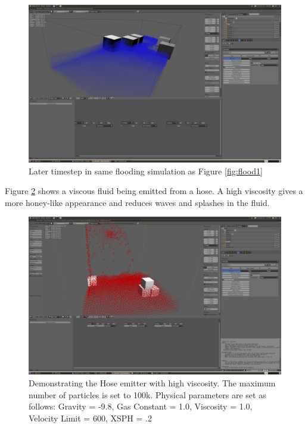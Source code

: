 {\pagebreak
\clearpage

\begin{figure}[!htc]
		\includegraphics[scale=0.4]{figures/flood2.png}
        \caption{ Later timestep in same flooding simulation as Figure \ref{fig:flood1} }
		\label{fig:flood2}
\end{figure}

\pagebreak
\clearpage

Figure \ref{fig:viscous} shows a viscous fluid being emitted from a hose. A
high viscosity gives a more honey-like appearance and reduces waves and
splashes in the fluid.

\begin{figure}[!htc]
		\includegraphics[scale=0.4]{figures/viscous.png}
        \caption{ Demonstrating the Hose emitter with high viscosity. The maximum number of particles is set to 100k.
        Physical parameters are set as follows: Gravity = -9.8, Gas
        Constant = 1.0, Viscosity = 1.0, Velocity Limit = 600, XSPH = .2}
		\label{fig:viscous}
\end{figure}

}
